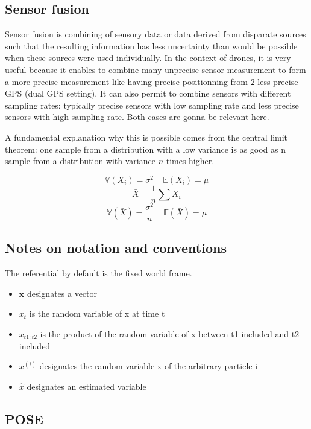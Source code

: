 \documentclass[12pt,]{article}
\providecommand{\tightlist}{%
  \setlength{\itemsep}{0pt}\setlength{\parskip}{0pt}}
\begin{document}
\subsection{Sensor fusion}\label{sensor-fusion}

Sensor fusion is combining of sensory data or data derived from
disparate sources such that the resulting information has less
uncertainty than would be possible when these sources were used
individually. In the context of drones, it is very useful because it
enables to combine many unprecise sensor measurement to form a more
precise measurement like having precise positionning from 2 less precise
GPS (dual GPS setting). It can also permit to combine sensors with
different sampling rates: typically precise sensors with low sampling
rate and less precise sensors with high sampling rate. Both cases are
gonna be relevant here.

A fundamental explanation why this is possible comes from the central
limit theorem: one sample from a distribution with a low variance is as
good as n sample from a distribution with variance \(n\) times higher.

\[\mathbb{V}(X_i)=\sigma^2 ~~~~~ \mathbb{E}(X_i) = \mu\]
\[\bar{X} = \frac{1}{n}\sum X_i\]
\[\mathbb{V}(\bar{X}) = \frac{\sigma^2}{n}  ~~~~~ \mathbb{E}(\bar{X}) = \mu\]

\subsection{Notes on notation and
conventions}\label{notes-on-notation-and-conventions}

The referential by default is the fixed world frame.

\begin{itemize}
\tightlist
\item
  \(\mathbf{x}\) designates a vector
\item
  \(x_t\) is the random variable of x at time t
\item
  \(x_{t1:t2}\) is the product of the random variable of x between t1
  included and t2 included
\item
  \(x^{(i)}\) designates the random variable x of the arbitrary particle
  i
\item
  \(\hat{x}\) designates an estimated variable
\end{itemize}

\subsection{POSE}\label{pose}
\end{document}
